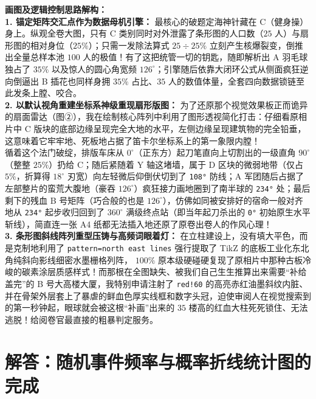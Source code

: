 \vspace{0.4cm}
{\small\color{blue!70!black}
\textbf{画图及逻辑控制思路解构：}\\
\textbf{1. 锚定矩阵交汇点作为数据母机引擎：} 最核心的破题定海神针藏在 C（健身操）身上。纵观全卷大图，只有 C 类别同时对外泄露了条形图的人口数（$25$ 人）与扇形图的相对身位（$25\%$）；只需一发除法算式 $25 \div 25\%$ 立刻产生核爆裂变，倒推出全量总样本池 $100$ 人的极值！有了这把统管一切的钥匙，随即解析出 A 羽毛球独占了 $35\%$ 以及惊人的圆心角宽频 $126^\circ$；引擎随后依靠大闭环公式从侧面疯狂逆向倒逼出 B 插花也同样身拥 $35\%$ 占比、$35$ 人的数值体量，全套四向数据锁链至此发条上膛、咬合。\\
\textbf{2. 以默认视角重建坐标系神级重现扇形版图：} 为了还原那个视觉效果板正而诡异的扇面雷达（图②），我在绘制核心阵列中利用了图形透视简化打击：仔细看原相片中 C 版块的底部边缘呈现完全大地的水平，左侧边缘呈现建筑物的完全铅垂，这意味着它牢牢地、死板地占据了笛卡尔坐标系上的第一象限内膛！\\
循着这个法门破绽，排版车床从 $0^\circ$（正东方）起刀笔直向上切割出的一级直角 $90^\circ$（整整 $25\%$）扔给 C；随后紧随着 Y 轴这堵墙，属于 D 区块的微弱地带（仅占 $5\%$，折算得 $18^\circ$ 刃宽）向左轻微后仰倒伏切到了 \texttt{108°} 防线；A 军团随后占据了左部整片的蛮荒大腹地（豪吞 $126^\circ$）疯狂接力画地圈到了南半球的 \texttt{234°} 处；最后剩下的残血 B 号矩阵（巧合般的也是 $126^\circ$），仿佛如同被安排好的宿命一般对齐地从 \texttt{234°} 起步收归回到了 $360^\circ$ 满级终点站（即当年起刀杀出的 \texttt{0°} 初始原生水平斩线），简直连一张 A4 纸都无法插入地还原了原卷出卷人的作风心理！\\
\textbf{3. 条形图斜线阵列重型压铸与高频词眼着灯：} 在立柱建设上，没有填大平色，而是克制地利用了 \texttt{pattern=north east lines} 强行提取了 TikZ 的底板工业化东北角纯斜向影线细密水墨栅格列阵， $100\%$ 原本级硬碰硬复现了原相片中那种古板冷峻的碳素涂层质感样式！而那根在全图缺失、被我们自己生生推算出来需要“补给盖完”的 B 号大高楼大厦，我特别申请注射了 \texttt{red!60} 的高亮赤红油墨斜纹内脏、并在骨架外层套上了暴虐的鲜血色厚实线框和数字头冠，迫使审阅人在视觉搜索到的第一秒钟起，眼球就会被这根“补画”出来的 $35$ 楼高的红血大柱死死锁住、无法逃脱！给阅卷官最直接的粗暴判定服务。
}

\newpage



\section{解答：随机事件频率与概率折线统计图的完成}

